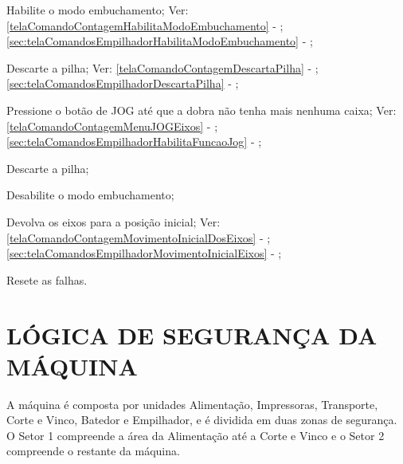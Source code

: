 \begin{procedureFixingIsuesSector2}

  \item[\ding{\dingNumber}] Habilite o modo embuchamento; Ver:
  \ifmachineType
  \ref{telaComandoContagemHabilitaModoEmbuchamento} - ;
  \else
  \ref{sec:telaComandosEmpilhadorHabilitaModoEmbuchamento} - ;
  \fi
  \item[\ding{\dingNumber}] Descarte a pilha; Ver:
  \ifmachineType
  \ref{telaComandoContagemDescartaPilha} - ;
  \else
  \ref{sec:telaComandosEmpilhadorDescartaPilha} - ;
  \fi
  \item[\ding{\dingNumber}] Pressione o botão de JOG até que a dobra não tenha mais nenhuma caixa; Ver:
  \ifmachineType
  \ref{telaComandoContagemMenuJOGEixos} - ;
  \else
  \ref{sec:telaComandosEmpilhadorHabilitaFuncaoJog} - ;
  \fi
  \item[\ding{\dingNumber}] Descarte a pilha;
  \item[\ding{\dingNumber}] Desabilite o modo embuchamento;
  \item[\ding{\dingNumber}] Devolva os eixos para a posição inicial; Ver:
  \ifmachineType
  \ref{telaComandoContagemMovimentoInicialDosEixos} - ;
  \else
  \ref{sec:telaComandosEmpilhadorMovimentoInicialEixos} - ;
  \fi
  \item[\ding{\dingNumber}] Resete as falhas.
  
\end{procedureFixingIsuesSector2}

\newpage
\thispagestyle{fancy}
\vspace*{40 pt}
  
\section{\large\MakeUppercase{{Lógica de segurança da máquina}}}

A máquina é composta por unidades Alimentação, Impressoras, Transporte, Corte e Vinco, Batedor e Empilhador, e é dividida em duas zonas de segurança.
 O Setor 1 compreende a área da Alimentação até a Corte e Vinco e o Setor 2 compreende o restante da máquina.

